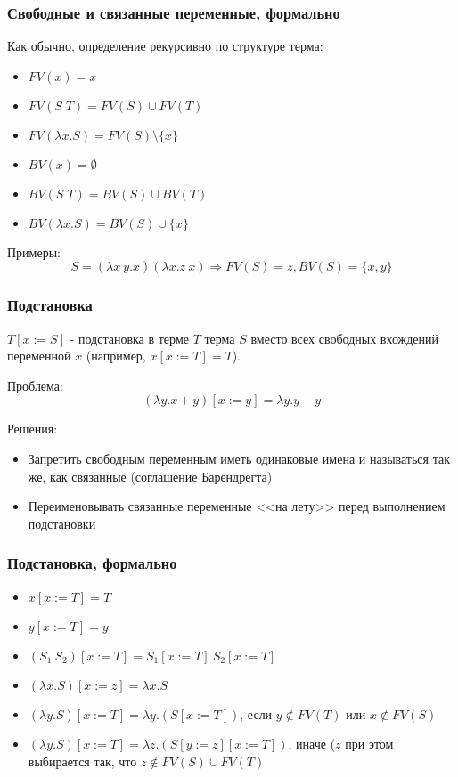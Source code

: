 \documentclass[xetex,mathserif,serif]{beamer}
\begin{document}
    \begin{frame}
        \frametitle{Свободные и связанные переменные, формально}
        Как обычно, определение рекурсивно по структуре терма:
        \begin{itemize}
            \item $FV(x) = x$
            \item $FV(S \; T) = FV(S) \cup FV(T)$
            \item $FV(\lambda x.S) = FV(S) \setminus \{x\}$
        \end{itemize}

        \begin{itemize}
            \item $BV(x) = \emptyset$
            \item $BV(S \; T) = BV(S) \cup BV(T)$
            \item $BV(\lambda x.S) = BV(S) \cup \{x\}$
        \end{itemize}
        Примеры:
        $$S = (\lambda x\ y.x) (\lambda x.z\ x) \Rightarrow FV(S) = {z}, BV(S) = \{x,y\}$$
    \end{frame}
    
    \begin{frame}
        \frametitle{Подстановка}
        $T[x := S]$ - подстановка в терме $T$ терма $S$ вместо всех свободных вхождений 
        переменной $x$ (например, $x[x := T] = T$).
        
        Проблема:
        $$(\lambda y.x + y)[x := y] = \lambda y. y + y$$
        
        Решения:
        \begin{itemize}
            \item Запретить свободным переменным иметь одинаковые имена и называться так же, 
                    как связанные (соглашение Барендрегта)
            \item Переименовывать связанные переменные <<на лету>> перед выполнением подстановки
        \end{itemize}		
    \end{frame}
    
    \begin{frame}
        \frametitle{Подстановка, формально}
        \begin{itemize}
            \item $x[x := T] = T$
            \item $y[x := T] = y$
            \item $(S_1\ S_2)[x := T] = S_1[x := T]\ S_2[x := T]$
            \item $(\lambda x.S)[x := z] = \lambda x.S$
            \item $(\lambda y.S)[x := T] = \lambda y.(S[x := T])$, если $y \notin FV(T)$ или $x \notin FV(S)$
            \item $(\lambda y.S)[x := T] = \lambda z.(S[y := z][x := T])$, иначе ($z$ при этом выбирается так, 
                    что $z \notin FV(S) \cup FV(T)$
        \end{itemize}		
    \end{frame}
        
\end{document}
